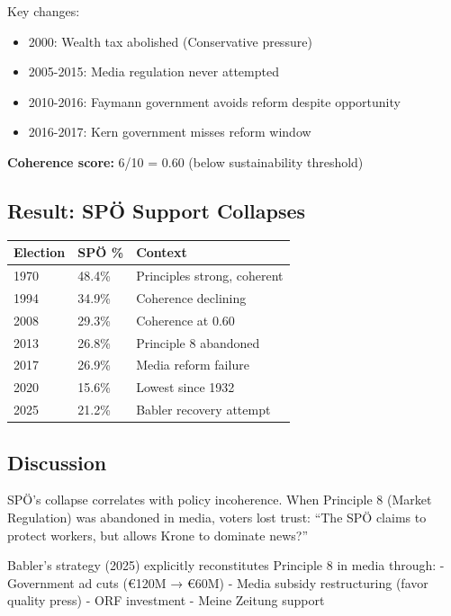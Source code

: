 Key changes:
\begin{itemize}
\item 2000: Wealth tax abolished (Conservative pressure)
\item 2005-2015: Media regulation never attempted
\item 2010-2016: Faymann government avoids reform despite opportunity
\item 2016-2017: Kern government misses reform window
\end{itemize}

\textbf{Coherence score:} 6/10 = 0.60 (below sustainability threshold)

\subsection{Result: SPÖ Support Collapses}

\begin{table}[h]
\centering
\small
\renewcommand{\arraystretch}{1.3}
\begin{tabular}{@{}lll@{}}
\toprule
\textbf{Election} & \textbf{SPÖ \%} & \textbf{Context} \\
\midrule
1970 & 48.4\% & Principles strong, coherent \\
1994 & 34.9\% & Coherence declining \\
2008 & 29.3\% & Coherence at 0.60 \\
2013 & 26.8\% & Principle 8 abandoned \\
2017 & 26.9\% & Media reform failure \\
2020 & 15.6\% & Lowest since 1932 \\
2025 & 21.2\% & Babler recovery attempt \\
\bottomrule
\end{tabular}
\end{table}

\subsection{Discussion}

SPÖ's collapse correlates with policy incoherence. When Principle 8 (Market Regulation) was abandoned in media, voters lost trust: ``The SPÖ claims to protect workers, but allows Krone to dominate news?''

Babler's strategy (2025) explicitly reconstitutes Principle 8 in media through:
- Government ad cuts (€120M → €60M)
- Media subsidy restructuring (favor quality press)
- ORF investment
- Meine Zeitung support

